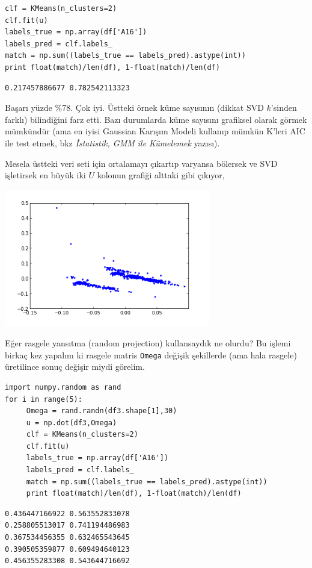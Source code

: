 \documentclass[12pt,fleqn]{article}\usepackage{../../common}
\begin{document}
\begin{verbatim}
clf = KMeans(n_clusters=2)
clf.fit(u)
labels_true = np.array(df['A16'])
labels_pred = clf.labels_
match = np.sum((labels_true == labels_pred).astype(int))
print float(match)/len(df), 1-float(match)/len(df)
\end{verbatim}

\begin{verbatim}
0.217457886677 0.782542113323
\end{verbatim}

Başarı yüzde \%78. Çok iyi. Üstteki örnek küme sayısının (dikkat SVD
$k$'sinden farklı) bilindiğini farz etti. Bazı durumlarda küme sayısını
grafiksel olarak görmek mümkündür (ama en iyisi Gaussian Karışım Modeli
kullanıp mümkün K'leri AIC ile test etmek, bkz {\em İstatistik, GMM ile
  Kümelemek} yazısı). 

Mesela üstteki veri seti için ortalamayı çıkartıp varyansa bölersek ve SVD
işletirsek en büyük iki $U$ kolonun grafiği alttaki gibi çıkıyor,

\includegraphics[height=6cm]{kmeans_4.png}

Eğer rasgele yansıtma (random projection) kullansaydık ne olurdu? Bu işlemi
birkaç kez yapalım ki rasgele matris \verb!Omega! değişik şekillerde (ama
hala rasgele) üretilince sonuç değişir miydi görelim.

\begin{verbatim}
import numpy.random as rand
for i in range(5):
     Omega = rand.randn(df3.shape[1],30)
     u = np.dot(df3,Omega)
     clf = KMeans(n_clusters=2)
     clf.fit(u)
     labels_true = np.array(df['A16'])
     labels_pred = clf.labels_
     match = np.sum((labels_true == labels_pred).astype(int))
     print float(match)/len(df), 1-float(match)/len(df)
\end{verbatim}

\begin{verbatim}
0.436447166922 0.563552833078
0.258805513017 0.741194486983
0.367534456355 0.632465543645
0.390505359877 0.609494640123
0.456355283308 0.543644716692
\end{verbatim}
\end{document}
